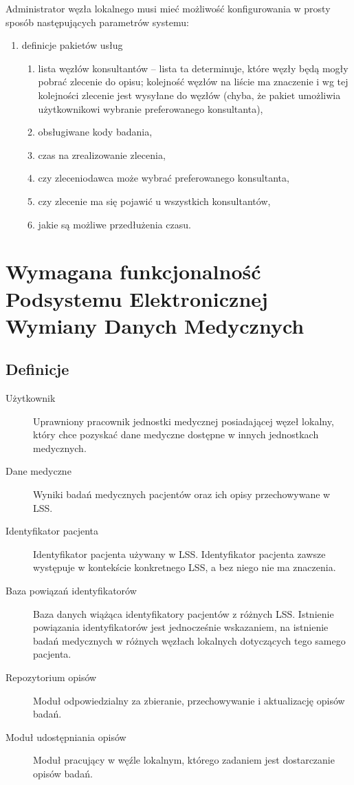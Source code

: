 \documentclass[a4paper]{report}
\begin{document}
Administrator węzła lokalnego musi mieć możliwość konfigurowania w prosty sposób następujących parametrów systemu:
\begin{enumerate}
\item definicje pakietów usług
  \begin{enumerate}
   \item lista węzłów konsultantów -- lista ta determinuje, które węzły będą mogły pobrać zlecenie do opisu; kolejność węzłów na liście ma znaczenie i wg tej kolejności zlecenie jest wysyłane do węzłów (chyba, że pakiet umożliwia użytkownikowi wybranie preferowanego konsultanta),
   \item obsługiwane kody badania,
   \item czas na zrealizowanie zlecenia,
   \item czy zleceniodawca może wybrać preferowanego konsultanta,
   \item czy zlecenie ma się pojawić u wszystkich konsultantów,
   \item jakie są możliwe przedłużenia czasu.
  \end{enumerate}


\end{enumerate}


\chapter[Podsystem Elektronicznej Wymiany Danych Medycznych]{Wymagana funkcjonalność Podsystemu Elektronicznej Wymiany Danych Medycznych}

\section{Definicje}
\begin{description}
\item[Użytkownik] Uprawniony pracownik jednostki medycznej posiadającej węzeł lokalny, który chce pozyskać dane
      medyczne dostępne w innych jednostkach medycznych.
\item[Dane medyczne] Wyniki badań medycznych pacjentów oraz ich opisy przechowywane w LSS.
\item[Identyfikator pacjenta] Identyfikator pacjenta używany w LSS. Identyfikator pacjenta zawsze występuje w kontekście
      konkretnego LSS, a bez niego nie ma znaczenia.
\item[Baza powiązań identyfikatorów] Baza danych wiążąca identyfikatory pacjentów z różnych LSS. Istnienie powiązania identyfikatorów jest jednocześnie wskazaniem, na istnienie badań medycznych w różnych węzłach lokalnych dotyczących tego samego pacjenta.
\item[Repozytorium opisów] Moduł odpowiedzialny za zbieranie, przechowywanie i aktualizację opisów badań.
\item[Moduł udostępniania opisów] Moduł pracujący w węźle lokalnym, którego zadaniem jest dostarczanie opisów badań.
\end{description}
\end{document}
